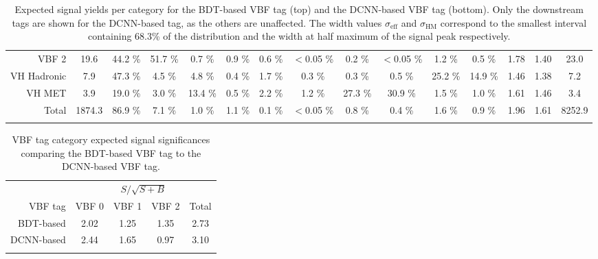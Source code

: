 \begin{landscape}
\begin{table}
{\begin{tabular}{rcccccccccccccc}
        \rowcolor{VBF2} VBF 2 &    19.6  &  44.2 \% &  51.7 \% &  0.7 \% &  0.9 \% &  0.6 \% &  $<$0.05 \% &  0.2 \% &  $<$0.05 \% &  1.2 \% &  0.5 \%& 1.78 & 1.40 & 23.0 \\
        \rowcolor{VHH} VH Hadronic &    7.9  &  47.3 \% &  4.5 \% &  4.8 \% &  0.4 \% &  1.7 \% &  0.3 \% &  0.3 \% &  0.5 \% &  25.2 \% &  14.9 \%& 1.46 & 1.38 & 7.2 \\
        \rowcolor{VHM} VH MET &    3.9  &  19.0 \% &  3.0 \% &  13.4 \% &  0.5 \% &  2.2 \% &  1.2 \% &  27.3 \% &  30.9 \% &  1.5 \% &  1.0 \%& 1.61 & 1.46 & 3.4 \\
        \rowcolor{Gray} Total &    1874.3  &  86.9 \% &  7.1 \% &  1.0 \% &  1.1 \% &  0.1 \% &  $<$0.05 \% &  0.8 \% &  0.4 \% &  1.6 \% &  0.9 \%& 1.96 & 1.61 & 8252.9 \\
        \thickhline
        \end{tabular}%
    }
        \caption{Expected signal yields per category for the BDT-based VBF tag (top) and the DCNN-based VBF tag (bottom). 
                 Only the downstream tags are shown for the DCNN-based tag, as the others are unaffected.
                 The width values $\sigma_{\text{eff}}$ and $\sigma_{\text{HM}}$ correspond to the smallest interval 
                 containing 68.3\% of the \mgg distribution and the width at half maximum of the signal peak respectively.}
        \label{tab:stats_results:yield_table}
    \end{table}
\end{landscape}
\begin{table}[h!]
    \centering
    \renewcommand{\arraystretch}{1.3}
    \begin{tabular}{r|cccc}
        \thickhline
        & \multicolumn{4}{c}{$S/\sqrt{S+B}$} \\ 
        VBF tag & VBF 0 & VBF 1 & VBF 2 & Total \\
        \hline
        BDT-based  & 2.02 & 1.25 & 1.35 & 2.73\\
        DCNN-based & 2.44 & 1.65 & 0.97 & 3.10\\
        \thickhline
    \end{tabular}
    \caption{VBF tag category expected signal significances comparing the BDT-based VBF tag to the DCNN-based VBF tag.}
    \label{tab:stats_results:sig_table}
\end{table}



